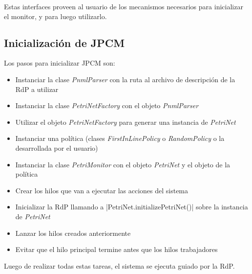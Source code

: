 Estas interfaces proveen al usuario de los mecanismos necesarios para
inicializar el monitor, y para luego utilizarlo.

\subsection{Inicialización de JPCM}
Los pasos para inicializar JPCM son:
\begin{itemize}
  \item Instanciar la clase \textit{PnmlParser} con la ruta al archivo de
  descripción de la RdP a utilizar
  \item Instanciar la clase \textit{PetriNetFactory} con el objeto
  \textit{PnmlParser}
  \item Utilizar el objeto \textit{PetriNetFactory} para generar una instancia
  de \textit{PetriNet}
  \item Instanciar una política (clases \textit{FirstInLinePolicy} o
  \textit{RandomPolicy} o la desarrollada por el usuario)
  \item Instanciar la clase \textit{PetriMonitor} con el objeto
  \textit{PetriNet} y el objeto de la política
  \item Crear los hilos que van a ejecutar las acciones del sistema
  \item Inicializar la RdP llamando a |PetriNet.initializePetriNet()|
  sobre la instancia de \textit{PetriNet}
  \item Lanzar los hilos creados anteriormente
  \item Evitar que el hilo principal termine antes que los hilos trabajadores
\end{itemize}
 
Luego de realizar todas estas tareas, el sistema se ejecuta guiado por la RdP.

